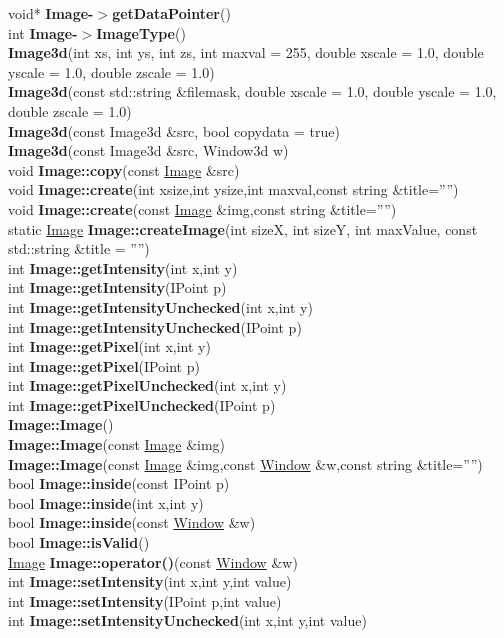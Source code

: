 \documentclass[10pt,titlepage]{article}
\def\functionlistentry#1#2#3#4#5#6{\noindent #1 {\bf #2}(#3) \dotfill #6\\}
\def\letterref#1{}
\def\letterlabelend#1{}
\begin{document}
{{\letterref{If}
\letterref{Im}
\letterref{In}
\letterref{Is}
\letterlabelend{Im}
\functionlistentry{void*}{Image-$>$getDataPointer}{}{72}{Images}{}
\functionlistentry{int}{Image-$>$ImageType}{}{71}{Images}{}
\functionlistentry{}{Image3d}{int xs, int ys, int zs, int maxval = 255, double xscale = 1.0, double yscale = 1.0, double zscale = 1.0}{73}{Images}{}
\functionlistentry{}{Image3d}{const std::string \&filemask, double xscale = 1.0, double yscale = 1.0, double zscale = 1.0}{74}{Images}{}
\functionlistentry{}{Image3d}{const Image3d \&src, bool copydata = true}{75}{Images}{}
\functionlistentry{}{Image3d}{const Image3d \&src, Window3d w}{76}{Images}{}
\functionlistentry{void}{Image::copy}{const \hyperlink{Image}{Image} \&src}{7}{Images}{}
\functionlistentry{void}{Image::create}{int xsize,int ysize,int maxval,const string \&title=''''}{5}{Images}{}
\functionlistentry{void}{Image::create}{const \hyperlink{Image}{Image} \&img,const string \&title=''''}{6}{Images}{}
\functionlistentry{static \hyperlink{Image}{Image}}{Image::createImage}{int sizeX, int sizeY, int maxValue, const std::string \&title = ''''}{8}{Images}{}
\functionlistentry{int}{Image::getIntensity}{int x,int y}{42}{Images}{}
\functionlistentry{int}{Image::getIntensity}{IPoint p}{43}{Images}{}
\functionlistentry{int}{Image::getIntensityUnchecked}{int x,int y}{44}{Images}{}
\functionlistentry{int}{Image::getIntensityUnchecked}{IPoint p}{45}{Images}{}
\functionlistentry{int}{Image::getPixel}{int x,int y}{34}{Images}{}
\functionlistentry{int}{Image::getPixel}{IPoint p}{35}{Images}{}
\functionlistentry{int}{Image::getPixelUnchecked}{int x,int y}{38}{Images}{}
\functionlistentry{int}{Image::getPixelUnchecked}{IPoint p}{39}{Images}{}
\functionlistentry{}{Image::Image}{}{3}{Images}{}
\functionlistentry{}{Image::Image}{const \hyperlink{Image}{Image} \&img}{4}{Images}{}
\functionlistentry{}{Image::Image}{const \hyperlink{Image}{Image} \&img,const \hyperlink{Window}{Window} \&w,const string \&title=''''}{30}{Images}{}
\functionlistentry{bool}{Image::inside}{const IPoint p}{58}{Images}{}
\functionlistentry{bool}{Image::inside}{int x,int y}{59}{Images}{}
\functionlistentry{bool}{Image::inside}{const \hyperlink{Window}{Window} \&w}{60}{Images}{}
\functionlistentry{bool}{Image::isValid}{}{13}{Images}{}
\functionlistentry{\hyperlink{Image}{Image}}{Image::operator()}{const \hyperlink{Window}{Window} \&w}{31}{Images}{}
\functionlistentry{int}{Image::setIntensity}{int x,int y,int value}{54}{Images}{}
\functionlistentry{int}{Image::setIntensity}{IPoint p,int value}{55}{Images}{}
\functionlistentry{int}{Image::setIntensityUnchecked}{int x,int y,int value}{56}{Images}{}
}}
\end{document}
